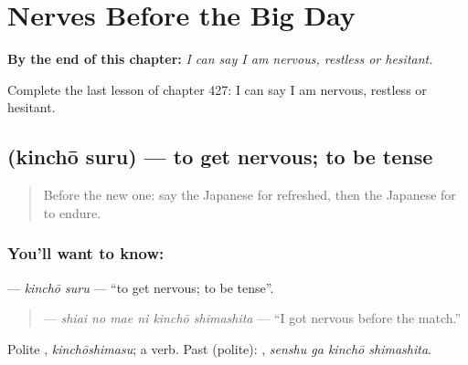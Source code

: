 
\chapter{Nerves Before the Big Day}
\label{ch:ja-nerves-before-the-big-day}

\begin{chapteropening}
\textbf{By the end of this chapter:} \emph{I can say I am nervous, restless or hesitant.}

Complete the last lesson of chapter 427: I can say I am nervous, restless or hesitant.
\end{chapteropening}

\section[\texorpdfstring{\ja{きんちょうする} (kinchō suru)}{きんちょうする (kinchō suru)}]{ (kinchō suru) — to get nervous; to be tense}

\label{lesson:JA-C427-kinchou-suru}



\begin{quote}
Before the new one: say the Japanese for refreshed, then the Japanese for to endure.
\end{quote}

\subsection*{You'll want to know: }
\textbf{} — \emph{kinchō suru} — \textquotedblleft{}to get nervous; to be tense\textquotedblright{}.

\begin{quote}
\textbf{  } — \emph{shiai no mae ni kinchō shimashita} — \textquotedblleft{}I got nervous before the match.\textquotedblright{}
\end{quote}

Polite \textbf{}, \emph{kinchōshimasu}; a  verb. Past (polite): \textbf{ }, \emph{senshu ga kinchō shimashita}.

